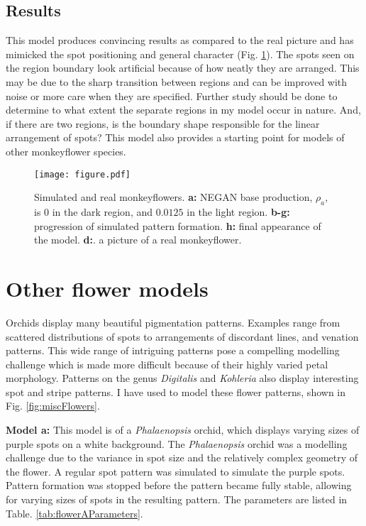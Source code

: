 \subsection*{Results}
This model produces convincing results as compared to the real picture and has mimicked the spot positioning and general character (Fig. \ref{fig:monkeyflower}). The spots seen on the region boundary look artificial because of how neatly they are arranged. This may be due to the sharp transition between regions and can be improved with noise or more care when they are specified. Further study should be done to determine to what extent the separate regions in my model occur in nature. And, if there are two regions, is the boundary shape responsible for the linear arrangement of spots? This model also provides a starting point for models of other monkeyflower species.

\begin{figure}[ht]
	\centering
	\texttt{[image: figure.pdf]}
	\caption{Simulated and real monkeyflowers. \textbf{a:} NEGAN base production, $\rho_a$, is 0 in the dark region, and $0.0125$ in the light region. \textbf{b-g:} progression of simulated pattern formation. \textbf{h:} final appearance of the model. \textbf{d:}. a picture of a real monkeyflower.}
	\label{fig:monkeyflower}
\end{figure}

\section{Other flower models}
Orchids display many beautiful pigmentation patterns. Examples range from scattered distributions of spots to arrangements of discordant lines, and venation patterns. This wide range of intriguing patterns pose a compelling modelling challenge which is made more difficult because of their highly varied petal morphology. Patterns on the genus \textit{Digitalis} and \textit{Kohleria} also display interesting spot and stripe patterns. I have used \ProgramName{} to model these flower patterns, shown in Fig. \ref{fig:miscFlowers}.

\textbf{Model a:} 
This model is of a \textit{Phalaenopsis} orchid, which displays varying sizes of purple spots on a white background. The \textit{Phalaenopsis} orchid was a modelling challenge due to the variance in spot size and the relatively complex geometry of the flower. A regular spot pattern was simulated to simulate the purple spots. Pattern formation was stopped before the pattern became fully stable, allowing for varying sizes of spots in the resulting pattern. The parameters are listed in Table. \ref{tab:flowerAParameters}.

